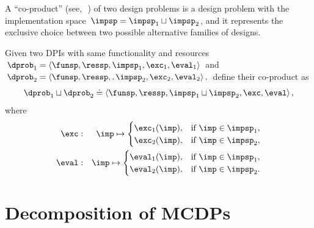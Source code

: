 A ``co-product'' (see,~\eg\,\cite[Section 2.4]{spivak14category})
of two design problems is a design problem with the implementation
space~$\impsp=\impsp_{1}\sqcup\impsp_{2}$, and it represents the
exclusive choice between two possible alternative families of designs.
\begin{defn}[Co-product]
\label{def:parallel-1}Given two DPIs with same functionality and
resources $\dprob_{1}=\left\langle \funsp,\ressp,\impsp_{1},\exc_{1},\eval_{1}\right\rangle $
and $\dprob_{2}=\left\langle \funsp,\ressp,,\impsp_{2},\exc_{2},\eval_{2}\right\rangle ,$
define their co-product as
\[
\dprob_{1}\sqcup\dprob_{2}\doteq\left\langle \funsp,\ressp,\impsp_{1}\sqcup\impsp_{2},\exc,\eval\right\rangle ,
\]
where
\begin{eqnarray}
\exc & : & \imp\mapsto\begin{cases}
\exc_{1}(\imp), & \text{if }\imp\in\impsp_{1},\\
\exc_{2}(\imp), & \text{if }\imp\in\impsp_{2},
\end{cases}\label{eq:dppar-exec-1}\\
\eval & : & \imp\mapsto\begin{cases}
\eval_{1}(\imp), & \text{if }\imp\in\impsp_{1},\\
\eval_{2}(\imp), & \text{if }\imp\in\impsp_{2}.
\end{cases}\nonumber 
\end{eqnarray}

\end{defn}

\section{Decomposition of MCDPs\label{sec:Decomposition}}

